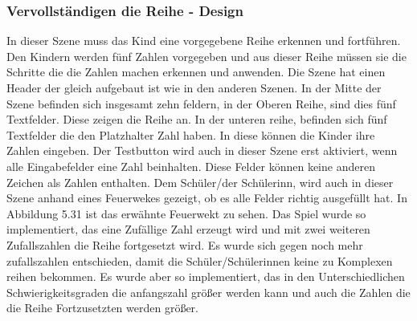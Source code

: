 \subsubsection{Vervollständigen die Reihe - Design}
In dieser Szene muss das Kind eine vorgegebene Reihe erkennen und fortführen. Den Kindern werden fünf Zahlen vorgegeben und aus dieser Reihe müssen sie die Schritte die die Zahlen machen erkennen und anwenden. Die Szene hat einen Header der gleich aufgebaut ist wie in den anderen Szenen. In der Mitte der Szene befinden sich insgesamt zehn feldern, in der Oberen Reihe, sind dies fünf Textfelder. Diese zeigen die Reihe an. In der unteren reihe, befinden sich fünf Textfelder die den Platzhalter Zahl haben. In diese können die Kinder ihre Zahlen eingeben. Der Testbutton wird auch in dieser Szene erst aktiviert, wenn alle Eingabefelder eine Zahl beinhalten. Diese Felder können keine anderen Zeichen als Zahlen enthalten. Dem Schüler/der Schülerinn, wird auch in dieser Szene anhand eines Feuerwekes gezeigt, ob es alle Felder richtig ausgefüllt hat. In Abbildung 5.31 ist das erwähnte Feuerwekt zu sehen. Das Spiel wurde so implementiert, das eine Zufällige Zahl erzeugt wird und mit zwei weiteren Zufallszahlen die Reihe fortgesetzt wird. Es wurde sich gegen noch mehr zufallszahlen entschieden, damit die Schüler/Schülerinnen keine zu Komplexen reihen bekommen. Es wurde aber so implementiert, das in den Unterschiedlichen Schwierigkeitsgraden die anfangszahl größer werden kann und auch die Zahlen die die Reihe Fortzusetzten werden größer.
